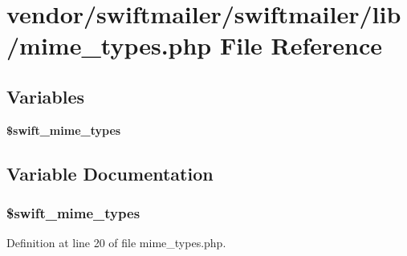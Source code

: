 \section{vendor/swiftmailer/swiftmailer/lib/mime\+\_\+types.php File Reference}
\label{mime__types_8php}
\subsection*{Variables}
\begin{DoxyCompactItemize}
\item 
{\bf \$swift\+\_\+mime\+\_\+types}
\end{DoxyCompactItemize}


\subsection{Variable Documentation}
\subsubsection[{\$swift\+\_\+mime\+\_\+types}]{\setlength{\rightskip}{0pt plus 5cm}\$swift\+\_\+mime\+\_\+types}\label{mime__types_8php_aa076901eb01c0f9d788b013baedd7a38}


Definition at line 20 of file mime\+\_\+types.\+php.

